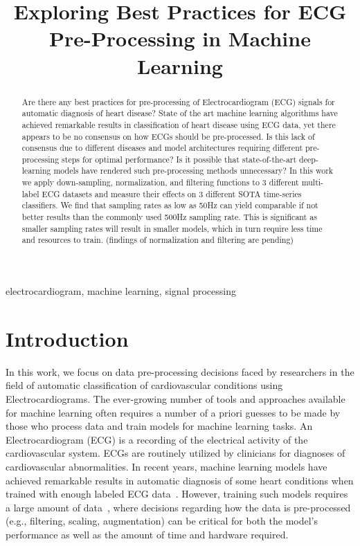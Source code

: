 \documentclass[pmlr,twocolumn]{jmlr}%
\title[ECG Scaling]{Exploring Best Practices for ECG Pre-Processing in Machine Learning}
\author{\Name{Amir Salimi} \Email{{asalimi@ualberta.ca}\\
\Name{Abram Hindle} \Email{abram.hindle@ualberta.ca}\\
\Name{Osmar Zaiane} \Email{zaiane@ualberta.ca}\\
\Name{others} \Email{CVC@ualberta.ca}\\
\addr University of Alberta}}
\begin{document}
\maketitle

\begin{abstract}
Are there any best practices for pre-processing of Electrocardiogram (ECG) signals for automatic diagnosis of heart disease? 
State of the art machine learning algorithms have achieved remarkable results in classification of heart disease using ECG data, yet there appears to be no consensus on how ECGs should be pre-processed.  Is this lack of consensus due to different diseases and model architectures requiring different pre-processing steps for optimal performance? Is it possible that state-of-the-art deep-learning models have rendered such pre-processing methods unnecessary? In this work we apply down-sampling, normalization, and filtering functions to 3 different multi-label ECG datasets and measure their effects on 3 different SOTA time-series classifiers. We find that sampling rates as low as 50Hz can yield comparable if not better results than the commonly used 500Hz sampling rate. This is significant as smaller sampling rates will result in smaller models, which in turn require less time and resources to train. (findings of normalization and filtering are pending)

\end{abstract}
\begin{keywords}
electrocardiogram, machine learning, signal processing
\end{keywords}


\section{Introduction}
\label{sec:intro}
In this work, we focus on data pre-processing decisions faced by researchers in the field of automatic classification of cardiovascular conditions using Electrocardiograms. The ever-growing number of tools and approaches available for machine learning often requires a number of a priori guesses to be made by those who process data and train models for machine learning tasks.
An Electrocardiogram (ECG) is a recording of the electrical activity of the cardiovascular system. ECGs are routinely utilized by clinicians for diagnoses of cardiovascular abnormalities. In recent years, machine learning models have achieved remarkable results in automatic diagnosis of some heart conditions when trained with enough labeled ECG data~\cite{reyna2021will,reyna4issues}. However, training such models requires a large amount of data~\cite{reyna2021will,reyna4issues,natarajan2020wide,ribeiro2020automatic}, where decisions regarding how the data is pre-processed (e.g., filtering, scaling, augmentation) can be critical for both the model's performance as well as the amount of time and hardware required. 
\end{document}

